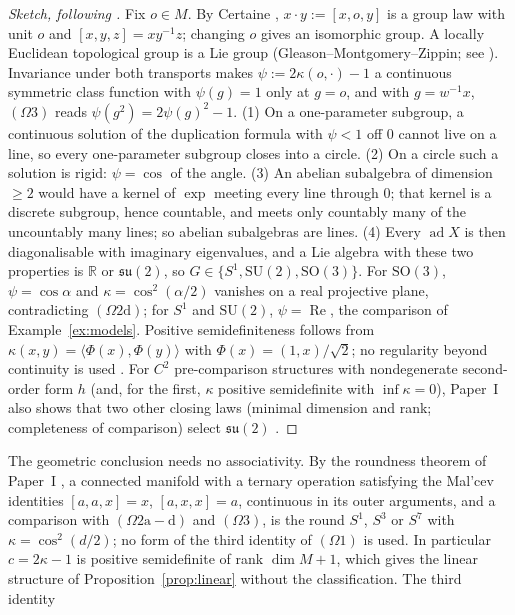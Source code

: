 \documentclass[aps,pra,onecolumn,superscriptaddress,nofootinbib,10pt]{revtex4-2}
\theoremstyle{definition}
\theoremstyle{remark}
\newcommand{\R}{\mathbb{R}}
\newcommand{\su}{\mathfrak{su}}
\newcommand{\ad}{\operatorname{ad}}
\newcommand{\re}{\operatorname{Re}}
\newcommand{\ip}[2]{\langle #1,#2\rangle}
\newcommand{\hp}[3]{[#1,#2,#3]}
\newcommand{\SU}{\mathrm{SU}}
\newcommand{\SO}{\mathrm{SO}}
\begin{document}
\begin{proof}[Sketch, following {\cite[Thm.~3.11]{PaperI}}]
Fix $o\in M$.  By Certaine \cite{Certaine}, $x\cdot y:=\hp{x}{o}{y}$ is a group law with unit $o$ and
$\hp{x}{y}{z}=xy^{-1}z$; changing $o$ gives an isomorphic group.  A locally Euclidean topological group
is a Lie group (Gleason--Montgomery--Zippin; see \cite[Lemma~2.2]{PaperI}).  Invariance under both transports makes
$\psi:=2\kappa(o,\cdot)-1$ a continuous symmetric class function with $\psi(g)=1$ only at $g=o$, and with
$g=w^{-1}x$, $(\Omega3)$ reads $\psi(g^2)=2\psi(g)^2-1$.  (1) On a one-parameter subgroup, a continuous
solution of the duplication formula with $\psi<1$ off $0$ cannot live on a line, so every one-parameter
subgroup closes into a circle.  (2) On a circle such a solution is rigid: $\psi=\cos$ of the angle.
(3) An abelian subalgebra of dimension $\ge2$ would have a kernel of $\exp$ meeting every line through
$0$; that kernel is a discrete subgroup, hence countable, and meets only countably many of the
uncountably many lines; so abelian subalgebras are lines.  (4) Every $\ad X$ is then
diagonalisable with imaginary eigenvalues, and a Lie algebra with these two properties is $\R$ or
$\su(2)$, so $G\in\{S^1,\SU(2),\SO(3)\}$.  For $\SO(3)$, $\psi=\cos\alpha$ and $\kappa=\cos^2(\alpha/2)$ vanishes on a
real projective plane, contradicting $(\Omega2\mathrm d)$; for $S^1$ and $\SU(2)$, $\psi=\re$, the comparison of
Example~\ref{ex:models}.  Positive semidefiniteness follows from $\kappa(x,y)=\ip{\Phi(x)}{\Phi(y)}$ with
$\Phi(x)=(1,x)/\sqrt2$; no regularity beyond continuity is used \cite[Thms.~3.1, 3.11]{PaperI}.  For $C^2$
pre-comparison structures with nondegenerate second-order form $h$ (and, for the first, $\kappa$ positive
semidefinite with $\inf\kappa=0$), Paper~I also shows that two other closing laws (minimal dimension and
rank; completeness of comparison) select $\su(2)$ \cite[Thms.~4.1, 4.2]{PaperI}.
\end{proof}
The geometric conclusion needs no associativity.  By the roundness theorem of Paper~I
\cite[Thm.~5.18, Cor.~5.19]{PaperI}, a connected manifold with a ternary operation satisfying the Mal'cev
identities $\hp aax=x$, $\hp axx=a$, continuous in its outer arguments, and a comparison with
$(\Omega2\mathrm{a{-}d})$ and $(\Omega3)$, is the round $S^1$, $S^3$ or $S^7$ with $\kappa=\cos^2(d/2)$; no form of the third
identity of $(\Omega1)$ is used.  In particular $c=2\kappa-1$ is positive semidefinite of rank $\dim M+1$, which
gives the linear structure of Proposition~\ref{prop:linear} without the classification.  The third identity
\end{document}
